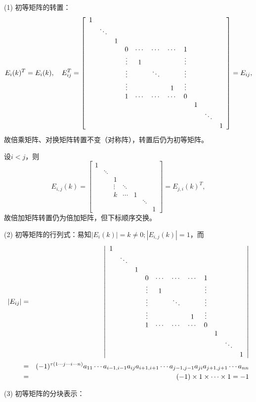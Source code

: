 \begin{prop}[初等矩阵的性质]\

\enum
\item[(1)] 初等矩阵的转置：
$$E_i(k)^T = E_i(k), \quad E_{ij}^T = \left[\begin{array}{*{11}c}
1 & & & & & & & & &  & \\ & \ddots & & & & & & & & & \\ & & 1 & & & & & & & & \\ & & & 0 & \cdots & \cdots & \cdots & 1 & & & \\ & & & \vdots & 1 & & & \vdots & & & \\ & & & \vdots & & \ddots & & \vdots & & & \\ & & & \vdots & & & 1 & \vdots & & & \\ & & & 1 & \cdots & \cdots & \cdots & 0 & & & \\ & & & & & & & & 1 & & \\ & & & & & & & & & \ddots & \\ & & & & & & & & & & 1 \end{array}\right] = E_{ij},$$
故倍乘矩阵、对换矩阵转置不变（对称阵），转置后仍为初等矩阵。

设$i < j$，则
$$E_{i,j}(k) = \begin{bmatrix} 1 & & & & & & \\ & \ddots & & & & & \\ & & 1 & & & & \\ & & \vdots & \ddots & & & \\ & & k & \cdots & 1 & &  \\ & & & & & \ddots & \\ & & & & & & 1 \end{bmatrix} = E_{j,i}(k)^T,$$
故倍加矩阵转置仍为倍加矩阵，但下标顺序交换。
\item[(2)] 初等矩阵的行列式：易知$|E_i(k)|=k\neq 0; |E_{i,j}(k)|=1$，而
\begin{eqnarray*}
|E_{ij}| & = & \left|\begin{array}{*{11}c}
1 & & & & & & & & &  & \\ & \ddots & & & & & & & & & \\ & & 1 & & & & & & & & \\ & & & 0 & \cdots & \cdots & \cdots & 1 & & & \\ & & & \vdots & 1 & & & \vdots & & & \\ & & & \vdots & & \ddots & & \vdots & & & \\ & & & \vdots & & & 1 & \vdots & & & \\ & & & 1 & \cdots & \cdots & \cdots & 0 & & & \\ & & & & & & & & 1 & & \\ & & & & & & & & & \ddots & \\ & & & & & & & & & & 1 \end{array}\right| \\
& = & (-1)^{\tau(1\cdots j\cdots i\cdots n)}a_{11}\cdots a_{i-1,i-1}a_{ij}a_{i+1,i+1}\cdots a_{j-1,j-1}a_{ji}a_{j+1,j+1}\cdots a_{nn} \\
& = & (-1)\times 1\times\cdots\times 1 = -1
\end{eqnarray*}
\item[(3)] 初等矩阵的分块表示：


\end{prop}
